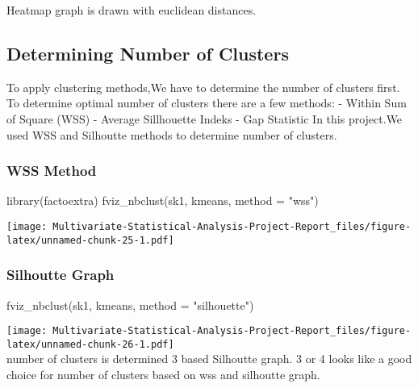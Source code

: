 \documentclass[12pt,twoside]{deuthesis}
\newenvironment{Shaded}{\begin{snugshade}}{\end{snugshade}}
\newcommand{\AttributeTok}[1]{\textcolor[rgb]{0.77,0.63,0.00}{#1}}
\newcommand{\FunctionTok}[1]{\textcolor[rgb]{0.00,0.00,0.00}{#1}}
\newcommand{\NormalTok}[1]{#1}
\newcommand{\StringTok}[1]{\textcolor[rgb]{0.31,0.60,0.02}{#1}}
\begin{document}
Heatmap graph is drawn with euclidean distances.

\hypertarget{determining-number-of-clusters}{%
\subsection{Determining Number of Clusters}\label{determining-number-of-clusters}}

To apply clustering methods,We have to determine the number of clusters first.
To determine optimal number of clusters there are a few methods:
- Within Sum of Square (WSS)
- Average Sillhouette Indeks
- Gap Statistic
In this project.We used WSS and Silhoutte methods to determine number of clusters.

\hypertarget{wss-method}{%
\subsubsection{WSS Method}\label{wss-method}}
\begin{Shaded}
\begin{Highlighting}[]
\FunctionTok{library}\NormalTok{(factoextra)}
\FunctionTok{fviz\_nbclust}\NormalTok{(sk1, kmeans, }\AttributeTok{method =} \StringTok{"wss"}\NormalTok{)}
\end{Highlighting}
\end{Shaded}
\texttt{[image: Multivariate-Statistical-Analysis-Project-Report\_files/figure-latex/unnamed-chunk-25-1.pdf]}

\hypertarget{silhoutte-graph}{%
\subsubsection{Silhoutte Graph}\label{silhoutte-graph}}
\begin{Shaded}
\begin{Highlighting}[]
\FunctionTok{fviz\_nbclust}\NormalTok{(sk1, kmeans, }\AttributeTok{method =} \StringTok{"silhouette"}\NormalTok{)}
\end{Highlighting}
\end{Shaded}
\texttt{[image: Multivariate-Statistical-Analysis-Project-Report\_files/figure-latex/unnamed-chunk-26-1.pdf]}\\
\setlength{\parindent}{0in}
number of clusters is determined 3 based Silhoutte graph.
3 or 4 looks like a good choice for number of clusters based on wss and silhoutte graph.
\end{document}
